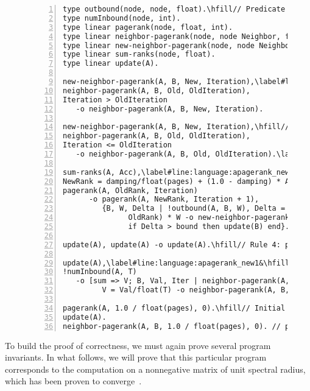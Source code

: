 \begin{figure}[h!]
\begin{Verbatim}[numbers=left,fontsize=\codesize,commandchars=\\\#\&]
type outbound(node, node, float).\hfill// Predicate declaration
type numInbound(node, int).
type linear pagerank(node, float, int).
type linear neighbor-pagerank(node, node Neighbor, float Rank, int Iteration).
type linear new-neighbor-pagerank(node, node Neighbor, float Rank, int Iteration).
type linear sum-ranks(node, float).
type linear update(A).

new-neighbor-pagerank(A, B, New, Iteration),\label#line:language:apagerank_update1&\hfill// Rule 1: update neighbor value
neighbor-pagerank(A, B, Old, OldIteration),
Iteration > OldIteration
   -o neighbor-pagerank(A, B, New, Iteration).

new-neighbor-pagerank(A, B, New, Iteration),\hfill// Rule 2: update neighbor value
neighbor-pagerank(A, B, Old, OldIteration),
Iteration <= OldIteration
   -o neighbor-pagerank(A, B, Old, OldIteration).\label#line:language:apagerank_update2&

sum-ranks(A, Acc),\label#line:language:apagerank_new1&\hfill// Rule 3: propagate new pagerank
NewRank = damping/float(pages) + (1.0 - damping) * Acc,
pagerank(A, OldRank, Iteration)
      -o pagerank(A, NewRank, Iteration + 1),
         {B, W, Delta | !outbound(A, B, W), Delta = fabs(NewRank -
               OldRank) * W -o new-neighbor-pagerank(B, A, NewRank, Iteration + 1),
               if Delta > bound then update(B) end}.\label#line:language:apagerank_new2&

update(A), update(A) -o update(A).\hfill// Rule 4: prune update facts

update(A),\label#line:language:apagerank_new1&\hfill// Rule 5: start update process
!numInbound(A, T)
   -o [sum => V; B, Val, Iter | neighbor-pagerank(A, B, Val, Iter),
         V = Val/float(T) -o neighbor-pagerank(A, B, Val, Iter) -> sum-ranks(A, V)].\label#line:language:apagerank_new2&

pagerank(A, 1.0 / float(pages), 0).\hfill// Initial facts
update(A).
neighbor-pagerank(A, B, 1.0 / float(pages), 0). // pagerank of B is ...
\end{Verbatim}
\label{language:code:async_pagerank}
\end{figure}

To build the proof of correctness, we must again prove several program
invariants. In what follows, we will prove that this particular program
corresponds to the computation on a nonnegative matrix of unit spectral
radius, which has been proven to
converge~\cite{DBLP:journals/corr/abs-cs-0606047,
Lubachevsky:1986:CAA:4904.4801}.


